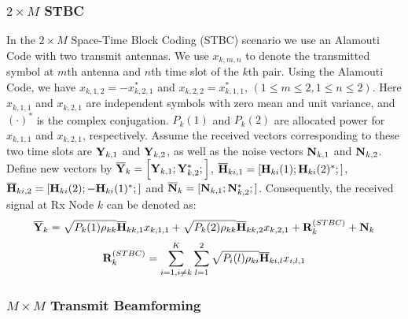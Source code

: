 \documentclass[draftcls,onecolumn,peerview,12pt]{IEEEtran}
\begin{document}
\subsubsection{$2 \times M$ STBC}

In the $2 \times M$ Space-Time Block Coding (STBC) scenario we use
an Alamouti Code \cite{17_alamouti} with two transmit antennas. We
use $x_{k,m,n} $ to denote the transmitted symbol at $m$th antenna
and $n$th time slot of the $k$th pair. Using the Alamouti Code, we
have $x_{k,1,2} =-x_{k,2,1}^\ast $ and $x_{k,2,2} =x_{k,1,1}^\ast $,
$(1\le m\le 2,1\le n\le 2)$. Here $x_{k,1,1} $ and $x_{k,2,1} $ are
independent symbols with zero mean and unit variance, and $(\cdot
)^\ast $ is the complex conjugation. $P_k(1)$ and $P_k(2)$ are
allocated power for $x_{k,1,1} $ and $x_{k,2,1} $, respectively.
Assume the received vectors corresponding to these two time slots
are ${\rm{\bf Y}}_{k,1}$ and ${\rm{\bf Y}}_{k,2}$, as well as the
noise vectors ${\rm{\bf N}}_{k,1}$ and ${\rm{\bf N}}_{k,2}$. Define
new vectors by $\overline{\rm{\bf Y}}_k = \left[{\rm{\bf
Y}}_{k,1};{\rm{\bf Y}}_{k,2}^{\ast};\right]$, $\overline{\rm{\bf
H}}_{ki,1} = \left[{\rm{\bf H}}_{ki}(1);{\rm{\bf
H}}_{ki}(2)^{\ast};\right]$, $\overline{\rm{\bf H}}_{ki,2} =
\left[{\rm{\bf H}}_{ki}(2);-{\rm{\bf H}}_{ki}(1)^{\ast};\right]$ and
$\overline{\rm{\bf N}}_k=[{\rm{\bf N}}_{k,1};{\rm{\bf
N}}_{k,2}^{\ast};]$. Consequently, the received signal at Rx Node
$k$ can be denoted as:
\begin{equation}
\overline {\rm {\bf Y}} _k =\sqrt {P_k (1)\rho _{kk} } \overline
{\rm {\bf H}} _{kk,1} x_{k,1,1} +\sqrt {P_k (2)\rho _{kk} }
\overline {\rm {\bf H}} _{kk,2} x_{k,2,1} +{\rm {\bf R}}_k^{(STBC)}
+{\rm {\bf N}}_k
\end{equation}
\begin{equation}
{\rm {\bf R}}_k^{(STBC)} =\sum\limits_{i=1,i\ne k}^K
{\sum\limits_{l=1}^2 {\sqrt {P_i (l)\rho _{ki} } \overline {\rm {\bf
H}} _{ki,l} x_{i,l,1} } }
\end{equation}

\subsubsection{$M \times M$ Transmit Beamforming}
\end{document}
